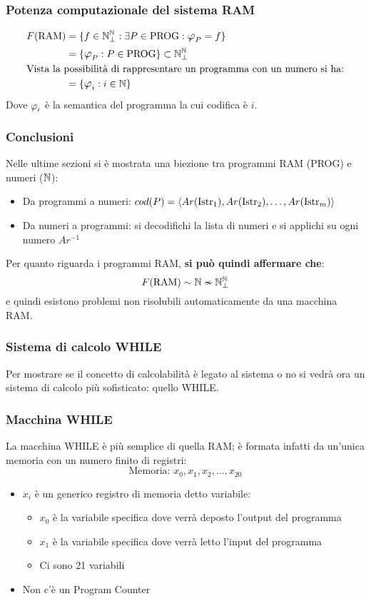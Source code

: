 \subsubsection*{Potenza computazionale del sistema RAM}
$$ \begin{aligned}
        F(\RAM) &= \{f\in\N_\perp^\N:\exists P \in \PROG: \semanticaRAM_P=f\}\\
                &= \{\semanticaRAM_P:P\in\PROG\} \subset \N_\perp^\N \\
                \multispan2{Vista la possibilità di rappresentare un programma
                 con un numero si ha:\hfill}\notag\\
                 &= \{\semanticaRAM_i:i\in\N\}
\end{aligned} $$
Dove $\semanticaRAM_i$ è la semantica del programma la cui codifica è $i$.
\subsubsection*{Conclusioni}
Nelle ultime sezioni si è mostrata una biezione tra programmi RAM (PROG) e numeri
($\mathbb{N}$):
    \begin{itemize}
        \item Da programmi a numeri:
            $cod(P)=\langle Ar(\text{Istr}_1),Ar(\text{Istr}_2),\dots,Ar(\text{Istr}_m)\rangle$
        \item Da numeri a programmi: si decodifichi la lista di numeri e si applichi su
            ogni numero $Ar^{-1}$
    \end{itemize}
Per quanto riguarda i programmi RAM, \textbf{si può quindi affermare che}:
$$ F(\text{RAM}) \sim \mathbb{N} \nsim \mathbb{N}^{\mathbb{N}}_\perp $$
e quindi esistono problemi non risolubili automaticamente da una macchina RAM.
\subsubsection{Sistema di calcolo WHILE}
Per mostrare se il concetto di calcolabilità è legato al sistema o no si vedrà ora un
sistema di calcolo più sofisticato: quello WHILE.
\subsubsection*{Macchina WHILE}
La macchina WHILE è più semplice di quella RAM; è formata infatti da un'unica memoria
con un numero finito di registri:
$$\text{Memoria: } x_0,x_1,x_2,\dots,x_{20}$$
\begin{itemize}
    \item $x_i$ è un generico registro di memoria detto variabile:
        \begin{itemize}
            \item $x_0$ è la variabile specifica dove verrà deposto l'output del programma
            \item $x_1$ è la variabile specifica dove verrà letto l'input del programma
            \item Ci sono 21 variabili
        \end{itemize}
    \item Non c'è un Program Counter
\end{itemize}

